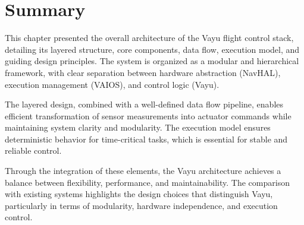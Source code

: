 \section{Summary}
\label{sec:summary}

This chapter presented the overall architecture of the Vayu flight control stack, detailing its layered structure, core components, data flow, execution model, and guiding design principles. The system is organized as a modular and hierarchical framework, with clear separation between hardware abstraction (NavHAL), execution management (VAIOS), and control logic (Vayu).

The layered design, combined with a well-defined data flow pipeline, enables efficient transformation of sensor measurements into actuator commands while maintaining system clarity and modularity. The execution model ensures deterministic behavior for time-critical tasks, which is essential for stable and reliable control.

Through the integration of these elements, the Vayu architecture achieves a balance between flexibility, performance, and maintainability. The comparison with existing systems highlights the design choices that distinguish Vayu, particularly in terms of modularity, hardware independence, and execution control.
